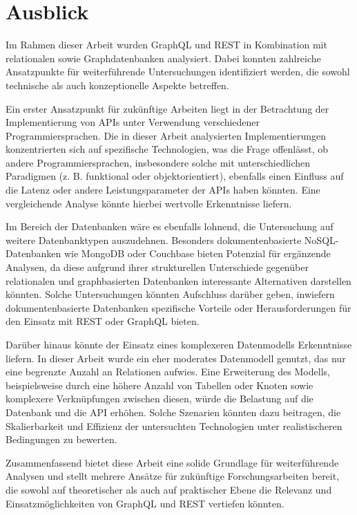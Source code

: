 \chapter{Ausblick} %
\label{sec:ausblick}
Im Rahmen dieser Arbeit wurden GraphQL und REST in Kombination mit relationalen sowie Graphdatenbanken analysiert. Dabei konnten zahlreiche Ansatzpunkte für weiterführende Untersuchungen identifiziert werden, die sowohl technische als auch konzeptionelle Aspekte betreffen.

\noindent
Ein erster Ansatzpunkt für zukünftige Arbeiten liegt in der Betrachtung der Implementierung von APIs unter Verwendung verschiedener Programmiersprachen. Die in dieser Arbeit analysierten Implementierungen konzentrierten sich auf spezifische Technologien, was die Frage offenlässt, ob andere Programmiersprachen, insbesondere solche mit unterschiedlichen Paradigmen (z. B. funktional oder objektorientiert), ebenfalls einen Einfluss auf die Latenz oder andere Leistungsparameter der APIs haben könnten. Eine vergleichende Analyse könnte hierbei wertvolle Erkenntnisse liefern.

\noindent
Im Bereich der Datenbanken wäre es ebenfalls lohnend, die Untersuchung auf weitere Datenbanktypen auszudehnen. Besonders dokumentenbasierte NoSQL-Datenbanken wie MongoDB oder Couchbase bieten Potenzial für ergänzende Analysen, da diese aufgrund ihrer strukturellen Unterschiede gegenüber relationalen und graphbasierten Datenbanken interessante Alternativen darstellen könnten. Solche Untersuchungen könnten Aufschluss darüber geben, inwiefern dokumentenbasierte Datenbanken spezifische Vorteile oder Herausforderungen für den Einsatz mit REST oder GraphQL bieten.

\noindent
Darüber hinaus könnte der Einsatz eines komplexeren Datenmodells Erkenntnisse liefern. In dieser Arbeit wurde ein eher moderates Datenmodell genutzt, das nur eine begrenzte Anzahl an Relationen aufwies. Eine Erweiterung des Modells, beispielsweise durch eine höhere Anzahl von Tabellen oder Knoten sowie komplexere Verknüpfungen zwischen diesen, würde die Belastung auf die Datenbank und die API erhöhen. Solche Szenarien könnten dazu beitragen, die Skalierbarkeit und Effizienz der untersuchten Technologien unter realistischeren Bedingungen zu bewerten.

\noindent
Zusammenfassend bietet diese Arbeit eine solide Grundlage für weiterführende Analysen und stellt mehrere Ansätze für zukünftige Forschungsarbeiten bereit, die sowohl auf theoretischer als auch auf praktischer Ebene die Relevanz und Einsatzmöglichkeiten von GraphQL und REST vertiefen könnten.


